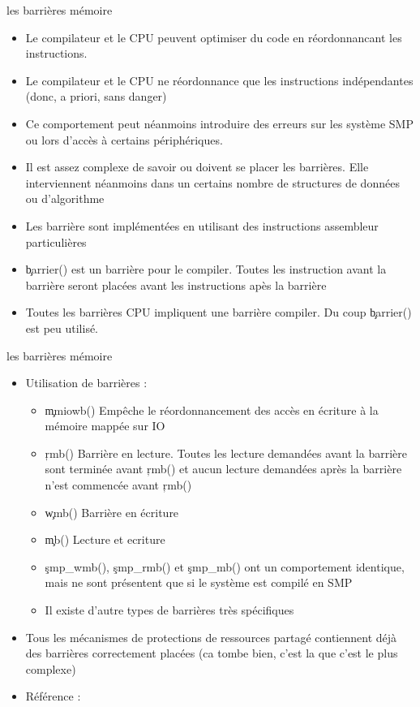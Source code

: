 \begin{frame}[fragile=singleslide]{les barrières mémoire}
  \begin{itemize} 
  \item  Le  compilateur  et  le  CPU peuvent  optimiser  du  code  en
    réordonnancant les instructions.
  \item Le compilateur et le  CPU ne réordonnance que les instructions
    indépendantes (donc, a priori, sans danger)
  \item Ce comportement peut  néanmoins introduire des erreurs sur les
    système SMP ou lors d'accès à certains périphériques.
  \item  Il est  assez complexe  de savoir  ou doivent  se  placer les
    barrières. Elle interviennent néanmoins dans un certains nombre de
    structures de données ou d'algorithme
  \item Les  barrière sont implémentées en  utilisant des instructions
    assembleur particulières
  \item \c{barrier()}  est un barrière  pour le compiler.   Toutes les
    instruction   avant   la  barrière   seront   placées  avant   les
    instructions apès la barrière
  \item Toutes les barrières  CPU impliquent une barrière compiler. Du
    coup \c{barrier()} est peu utilisé.
  \end{itemize}
\end{frame}

\begin{frame}[fragile=singleslide]{les barrières mémoire}
  \begin{itemize} 
  \item Utilisation de barrières :
    \begin{itemize}
    \item  \c{mmiowb()}  Empêche  le  réordonnancement  des  accès  en
      écriture à la mémoire mappée sur IO
    \item \c{rmb()} Barrière en  lecture. Toutes les lecture demandées
      avant la barrière sont terminée avant \c{rmb()} et aucun lecture
      demandées après la barrière n'est commencée avant \c{rmb()}
    \item \c{wmb()} Barrière en écriture
    \item \c{mb()} Lecture et ecriture
    \item   \c{smp_wmb()},  \c{smp_rmb()}   et  \c{smp_mb()}   ont  un
      comportement  identique,  mais  ne  sont présentent  que  si  le
      système est compilé en SMP
    \item Il existe d'autre types de barrières très spécifiques
    \end{itemize} 
  \item  Tous  les  mécanismes  de protections  de  ressources  partagé
    contiennent  déjà  des barrières  correctement  placées (ca  tombe
    bien, c'est la que c'est le plus complexe)
   
  \item Référence : 
  \end{itemize} 
\end{frame} 
